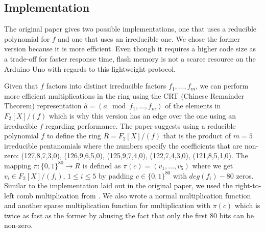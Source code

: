 \documentclass[11pt,a4paper]{article}
\begin{document}
\subsection{Implementation}

The original paper \cite{lapin} gives two possible implementations, one that uses a reducible polynomial for $f$ and one that uses an irreducible one.
We chose the former version because it is more efficient. Even though it requires a higher code size as a trade-off for faster response time, flash memory is not a scarce resource on the Arduino Uno with regards to this lightweight protocol. 

Given that $f$ factors into distinct irreducible factors $f_1,\dots ,f_m$, we can perform more efficient multiplications in the ring using the CRT (Chinese Remainder Theorem) representation $\hat{a} = (a \mod f_1, \dots ,f_m)$ of the elements in $F_2[X] / (f)$ which is why this version has an edge over the one using an irreducible $f$ regarding performance. 
The paper suggests using a reducible polynomial $f$ to define the ring $R = F_2[X] / (f)$ that is the product of $m = 5$ irreducible pentanomials where the numbers specify the coefficients that are non-zero: (127,8,7,3,0), (126,9,6,5,0), (125,9,7,4,0), (122,7,4,3,0), (121,8,5,1,0). 
The mapping $\pi: \{0, 1\}^{80} \rightarrow R$ is defined as $\pi(c) = (v_1,\dots, v_5)$ where we get $v_i \in F_2[X] / (f_i)$, $1 \leq i \leq 5$ by  padding $c \in \{0,1\}^{80}$ with $deg(f_i) - 80$ zeros.
Similar to the implementation laid out in the original paper, we used the right-to-left comb multiplication from \cite{hankerson}. We also wrote a normal multiplication function and another sparse multiplication function for multiplication with $\pi(c)$ which is twice as fast as the former by abusing the fact that only the first 80 bits can be non-zero.




\newpage
{}


\end{document}
